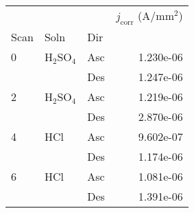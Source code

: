 \begin{tabular}{lllr}
\toprule
  &     &     &  $j_{\text{corr}}$ (A/mm$^2$) \\
Scan & Soln & Dir &                               \\
\midrule
0 & H$_2$SO$_4$ & Asc &                     1.230e-06 \\
  &     & Des &                     1.247e-06 \\
2 & H$_2$SO$_4$ & Asc &                     1.219e-06 \\
  &     & Des &                     2.870e-06 \\
4 & HCl & Asc &                     9.602e-07 \\
  &     & Des &                     1.174e-06 \\
6 & HCl & Asc &                     1.081e-06 \\
  &     & Des &                     1.391e-06 \\
\bottomrule
\end{tabular}
